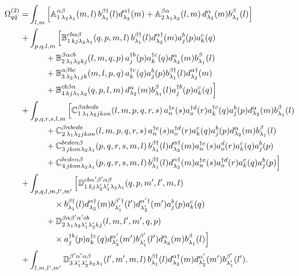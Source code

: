 {\small
\begin{align}
\Omega^{(2)}_{q\bar q}=&\int_{l,m}\Big[\mathbb{A}^{\alpha\beta}_{1\,\lambda_{2}\lambda_{1}}(m,l)\,
b^{\beta\dagger}_{\lambda_{1}}(l)d^{\alpha\dagger}_{\lambda_{2}}(m)
+\mathbb{A}^{\beta\alpha}_{2\,\lambda_{1}\lambda_{2}}(l,m)\,d^{\alpha}_{\lambda_{2}}(m)b^{\beta}_{\lambda_{1}}(l)\Big]
\nonumber\\
+&\int_{p,q,l,m}\Big[\mathbb{B}^{cb\alpha\beta}_{1\,kj\lambda_{2}\lambda_{1}}(q,p,m,l)\,
b^{\beta\dagger}_{\lambda_{1}}(l)d^{\alpha\dagger}_{\lambda_{2}}(m)a^{b}_{j}(p)a^{c}_{k}(q)
\nonumber\\
&\qquad+\mathbb{B}^{\beta\alpha cb}_{2\,\lambda_{1}\lambda_{2}kj}(l,m,q,p)\,
a^{\dagger b}_{j}(p)a^{\dagger c}_{k}(q)d^{\alpha}_{\lambda_{2}}(m)b^{\beta}_{\lambda_{1}}(l)
\nonumber\\
&\qquad+\mathbb{B}^{\alpha\beta bc}_{3\,\lambda_{2}\lambda_{1}jk}(m,l,p,q)\,
a^{\dagger c}_{k}(q)a^{b}_{j}(p)b^{\beta\dagger}_{\lambda_{1}}(l)d^{\alpha\dagger}_{\lambda_{2}}(m)
\nonumber\\
&\qquad+\mathbb{B}^{cb\beta\alpha}_{4\,kj\lambda_{1}\lambda_{2}}(q,p,l,m)\,
d^{\alpha}_{\lambda_{2}}(m)b^{\beta}_{\lambda_{1}}(l)a^{\dagger b}_{j}(p)a^{c}_{k}(q)\Big]
\nonumber\\
+&\int_{p,q,r,s,l,m}\Big[
\mathbb{C}^{\beta\alpha bcde}_{1\,\lambda_{1}\lambda_{2}jkon}(l,m,p,q,r,s)\,
a^{\dagger e}_{n}(s)a^{\dagger d}_{o}(r)a^{\dagger c}_{k}(q)a^{b}_{j}(p)d^{\alpha}_{\lambda_{2}}(m)b^{\beta}_{\lambda_{1}}(l)
\nonumber\\
&\qquad+\mathbb{C}^{\beta\alpha bcde}_{2\,\lambda_{1}\lambda_{2}jkon}(l,m,p,q,r,s)\,
a^{\dagger e}_{n}(s)a^{\dagger d}_{o}(r)a^{c}_{k}(q)a^{b}_{j}(p)d^{\alpha}_{\lambda_{2}}(m)b^{\beta}_{\lambda_{1}}(l)
\nonumber\\
&\qquad+\mathbb{C}^{bcde\alpha\beta}_{3\,jkon\lambda_{2}\lambda_{1}}(p,q,r,s,m,l)\,
b^{\beta\dagger}_{\lambda_{1}}(l)d^{\alpha\dagger}_{\lambda_{2}}(m)a^{\dagger e}_{n}(s)a^{d}_{o}(r)a^{c}_{k}(q)a^{b}_{j}(p)
\nonumber\\
&\qquad+\mathbb{C}^{bcde\alpha\beta}_{4\,jkon\lambda_{2}\lambda_{1}}(p,q,r,s,m,l)\,
b^{\beta\dagger}_{\lambda_{1}}(l)d^{\alpha\dagger}_{\lambda_{2}}(m)a^{\dagger e}_{n}(s)a^{\dagger d}_{o}(r)a^{c}_{k}(q)a^{b}_{j}(p)\Big]
\nonumber\\
+&\int_{p,q,l,m,l',m'}\Big[
\mathbb{D}^{cb\alpha'\beta'\alpha\beta}_{1\,kj\lambda_{2}'\lambda_{1}'\lambda_{2}\lambda_{1}}(q,p,m',l',m,l)
\nonumber\\
&\qquad\quad\times b^{\beta\dagger}_{\lambda_{1}}(l)d^{\alpha\dagger}_{\lambda_{2}}(m)b^{\beta'\dagger}_{\lambda_{1}'}(l')d^{\alpha'\dagger}_{\lambda_{2}'}(m')a^{b}_{j}(p)a^{c}_{k}(q)
\nonumber\\
&\qquad+\mathbb{D}^{\beta\alpha\beta'\alpha'cb}_{2\,\lambda_{1}\lambda_{2}\lambda_{1}'\lambda_{2}'kj}(l,m,l',m',q,p)
\nonumber\\
&\qquad\quad\times a^{\dagger b}_{j}(p)a^{\dagger c}_{k}(q)d^{\alpha'}_{\lambda_{2}'}(m')b^{\beta'}_{\lambda_{1}'}(l')d^{\alpha}_{\lambda_{2}}(m)b^{\beta}_{\lambda_{1}}(l)\Big]
\nonumber\\
+&\int_{l,m,l',m'}
\mathbb{D}^{\beta'\alpha'\alpha\beta}_{3\,\lambda_{1}'\lambda_{2}'\lambda_{2}\lambda_{1}}(l',m',m,l)\,
b^{\beta\dagger}_{\lambda_{1}}(l)d^{\alpha\dagger}_{\lambda_{2}}(m)d^{\alpha'}_{\lambda_{2}'}(m')b^{\beta'}_{\lambda_{1}'}(l') .
\label{eq:Om2qq}
\end{align}}
